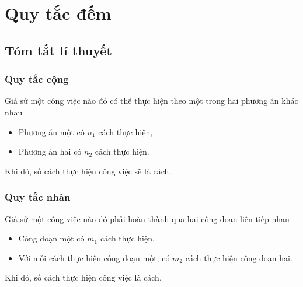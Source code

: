 \setcounter{section}{0}
\setcounter{dang}{0}
\section{Quy tắc đếm}
\subsection{Tóm tắt lí thuyết}
\subsubsection{Quy tắc cộng}
Giả sử một công việc nào đó có thể thực hiện theo một trong hai phương án khác nhau
\begin{itemize}
\item Phương án một có $n_1$ cách thực hiện,
\item Phương án hai có $n_2$ cách thực hiện.
\end{itemize}
Khi đó, số cách thực hiện công việc sẽ là  cách.
\subsubsection{Quy tắc nhân}
Giả sử một công việc nào đó phải hoàn thành qua hai công đoạn liên tiếp nhau
\begin{itemize}
\item Công đoạn một có $m_1$ cách thực hiện,
\item Với mỗi cách thực hiện công đoạn một, có $m_2$ cách thực hiện công đoạn hai.
\end{itemize}
Khi đó, số cách thực hiện công việc là  cách.

